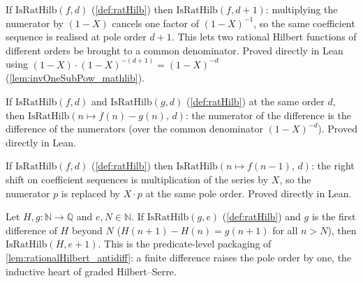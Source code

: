 \begin{lemma}\leanok
  \label{lem:ratHilb_bump}
  If \(\mathrm{IsRatHilb}(f, d)\) (\cref{def:ratHilb}) then
  \(\mathrm{IsRatHilb}(f, d+1)\): multiplying the numerator by \((1-X)\) cancels
  one factor of \((1-X)^{-1}\), so the same coefficient sequence is realised at
  pole order \(d+1\). This lets two rational Hilbert functions of different
  orders be brought to a common denominator. Proved directly in Lean using
  \((1-X)\cdot(1-X)^{-(d+1)} = (1-X)^{-d}\) (\cref{lem:invOneSubPow_mathlib}).
\end{lemma}

\begin{lemma}\leanok
  \label{lem:ratHilb_sub}
  If \(\mathrm{IsRatHilb}(f, d)\) and \(\mathrm{IsRatHilb}(g, d)\)
  (\cref{def:ratHilb}) at the same order \(d\), then
  \(\mathrm{IsRatHilb}(n \mapsto f(n) - g(n),\, d)\): the numerator of the
  difference is the difference of the numerators (over the common denominator
  \((1-X)^{-d}\)). Proved directly in Lean.
\end{lemma}

\begin{lemma}\leanok
  \label{lem:ratHilb_shiftRight}
  If \(\mathrm{IsRatHilb}(f, d)\) (\cref{def:ratHilb}) then
  \(\mathrm{IsRatHilb}(n \mapsto f(n-1),\, d)\): the right shift on coefficient
  sequences is multiplication of the series by \(X\), so the numerator
  \(p\) is replaced by \(X\cdot p\) at the same pole order. Proved directly in
  Lean.
\end{lemma}

\begin{lemma}\leanok
  \label{lem:ratHilb_antidiff}
  Let \(H, g : \mathbb{N} \to \mathbb{Q}\) and \(e, N \in \mathbb{N}\). If
  \(\mathrm{IsRatHilb}(g, e)\) (\cref{def:ratHilb}) and \(g\) is the first
  difference of \(H\) beyond \(N\) (\(H(n+1) - H(n) = g(n+1)\) for all
  \(n > N\)), then \(\mathrm{IsRatHilb}(H, e+1)\). This is the predicate-level
  packaging of \cref{lem:rationalHilbert_antidiff}: a finite difference raises
  the pole order by one, the inductive heart of graded Hilbert--Serre.
\end{lemma}

